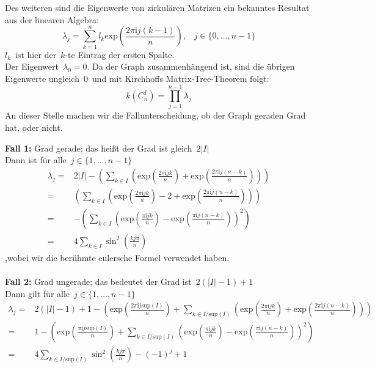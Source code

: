 Des weiteren sind die Eigenwerte von zirkulären Matrizen ein bekanntes Resultat aus der linearen Algebra:
\begin{equation}
 \lambda_j = \sum_{k=1}^{n}l_k\mathrm{exp}{\left(\frac{2\pi \mathrm{i}j(k-1)}{n}\right)}, \,\,\,\,\, {j\in\{0,\ldots,n-1\}}
 \label{cGE}
\end{equation}
$l_k\,$ ist hier der $\,k$-te Eintrag der ersten Spalte.\\ 
Der Eigenwert $\,\lambda_0 = 0$.\; \;  Da der Graph zusammenhängend ist, sind die übrigen Eigenwerte ungleich $\,0\,$ und mit Kirchhoffs Matrix-Tree-Theorem folgt:
\begin{equation}
 \mathit{k}(C_n^I)=\prod_{j=1}^{n-1} \lambda_j
\end{equation}
An dieser Stelle machen wir die Fallunterscheidung, ob der Graph geraden Grad hat, oder nicht.\\
\par
\begingroup
\leftskip=20pt
\rightskip=20pt
\noindent
\textbf{Fall 1:} Grad gerade; das heißt der Grad ist gleich $\,2|I|$\\
Dann ist für alle $\,j \in \{1,\ldots,n-1\}$
\begin{equation}
\begin{aligned}
 \lambda_j = {} & {2|I| - \left( \sum_{k\in I}\left(\mathrm{exp}{\left(\frac{2\pi \mathrm{i}jk}{n}\right)} + \mathrm{exp}{\left(\frac{2\pi \mathrm{i}j(n-k)}{n}\right)}\right)\right)}\\
 = {} & {\left( \sum_{k\in I}\left(\mathrm{exp}{\left(\frac{2\pi \mathrm{i}jk}{n}\right)} - 2 + \mathrm{exp}{\left(\frac{2\pi \mathrm{i}j(n-k)}{n}\right)}\right)\right)}\\
 = {} &-\left( \sum_{k\in I}\left(\mathrm{exp}{\left(\frac{\pi \mathrm{i}jk}{n}\right)} - \mathrm{exp}{\left(\frac{\pi \mathrm{i}j(n-k)}{n}\right)}\right)^2\right)\\
 ={} & 4\sum_{k\in I} \sin^2 \left( \frac{kj\pi}{n}\right)
 \end{aligned}
\end{equation}
,wobei wir die berühmte eulersche Formel verwendet haben.\\
\\ \textbf{Fall 2:} Grad ungerade; das bedeutet der Grad ist $\,2(|I|-1) + 1$\\
Dann gilt für alle $\,j \in \{1,\ldots,n-1\}$
\small
\begin{equation}
\begin{aligned}
 \lambda_j = {} & { 2(|I|-1)+1 - \left(\mathrm{exp}{\left(\frac{2\pi \mathrm{i}j \mathrm{sup}(I)}{n}\right)}+ \sum_{k\in I/\mathrm{sup}(I)}\left(\mathrm{exp}{\left(\frac{2\pi \mathrm{i}jk}{n}\right)}+ \mathrm{exp}{\left(\frac{2\pi \mathrm{i}j(n-k)}{n}\right)}\right)\right)}\\
  = {} &1-\left(\mathrm{exp}{\left(\frac{\pi \mathrm{i}j \mathrm{sup}(I)}{n}\right)} +\sum_{k\in I/\mathrm{sup}(I)}\left(\mathrm{exp}{\left(\frac{\pi \mathrm{i}jk}{n}\right)} - \mathrm{exp}{\left(\frac{\pi \mathrm{i}j(n-k)}{n}\right)}\right)^2\right)\\
  = {} & 4\sum_{k\in I/\mathrm{sup}(I)} \sin^2 \left( \frac{kj\pi}{n}\right)-(-1)^j+1
 \end{aligned}
\end{equation}
